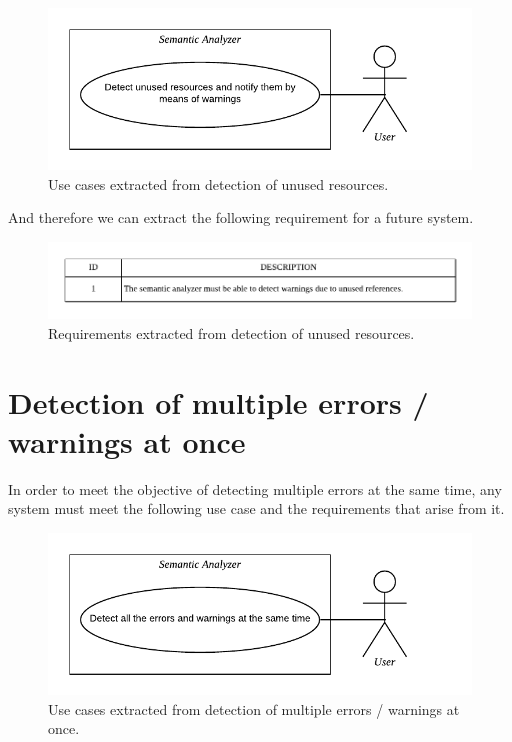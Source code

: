 \begin{figure}[h!]
    \includegraphics[scale=0.8]{images/unu-res-use-case.pdf}
    \centering
    \caption[Use cases extracted from detection of unused resources]{Use cases extracted from detection of unused resources.}
    \label{fig:unu-res-use-case}
\end{figure}

And therefore we can extract the following requirement for a future system.

\begin{figure}[h!]
    \includegraphics[scale=0.8]{images/unu-res-req.pdf}
    \centering
    \caption[Requirements extracted from detection of unused resources]{Requirements extracted from detection of unused resources.}
    \label{fig:unu-res-req}
\end{figure}

\section{Detection of multiple errors / warnings at once}
In order to meet the objective of detecting multiple errors at the same
time, any system must meet the following use case and the requirements
that arise from it.

\begin{figure}[h!]
    \includegraphics[scale=0.8]{images/mul-err-use-case.pdf}
    \centering
    \caption[Use cases extracted from detection of multiple errors / warnings at once]{Use cases extracted from detection of multiple errors / warnings at once.}
    \label{fig:mul-err-use-case}
\end{figure}

